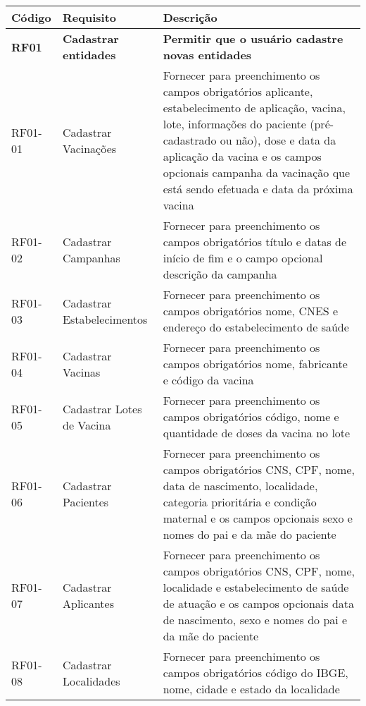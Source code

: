 
\label{apendice:requisitos_funcionais_detalhados}

\begin{longtable}{
  | >{\centering}m{} 
  | >{\centering}m{} 
  | m{} |}
  
    \hline
    \rowcolor{green!100}
    \textbf{Código} & \textbf{Requisito} & \textbf{Descrição} \\ \hline \hline
    \textbf{RF01}  &  \textbf{Cadastrar entidades} & \textbf{Permitir que o usuário cadastre novas entidades}  \\ \hline \hline
    RF01-01 & Cadastrar Vacinações              & Fornecer para preenchimento os campos obrigatórios aplicante, estabelecimento de aplicação, vacina, lote, informações do paciente (pré-cadastrado ou não), dose e data da aplicação da vacina e os campos opcionais campanha da vacinação que está sendo efetuada e data da próxima vacina \\ \hline
    RF01-02 & Cadastrar Campanhas               & Fornecer para preenchimento os campos obrigatórios título e datas de início de fim e o campo opcional descrição da campanha  \\ \hline
    RF01-03 & Cadastrar Estabelecimentos        & Fornecer para preenchimento os campos obrigatórios nome, CNES e endereço do estabelecimento de saúde \\ \hline
    RF01-04 & Cadastrar Vacinas                 & Fornecer para preenchimento os campos obrigatórios nome, fabricante e código da vacina \\ \hline
    RF01-05 & Cadastrar Lotes de Vacina         & Fornecer para preenchimento os campos obrigatórios código, nome e quantidade de doses da vacina no lote \\ \hline
    RF01-06 & Cadastrar Pacientes               & Fornecer para preenchimento os campos obrigatórios CNS, CPF, nome, data de nascimento, localidade, categoria prioritária e condição maternal e os campos opcionais sexo e nomes do pai e da mãe do paciente \\ \hline
    RF01-07 & Cadastrar Aplicantes              & Fornecer para preenchimento os campos obrigatórios CNS, CPF, nome, localidade e estabelecimento de saúde de atuação e os campos opcionais data de nascimento, sexo e nomes do pai e da mãe do paciente \\ \hline
    RF01-08 & Cadastrar Localidades             & Fornecer para preenchimento os campos obrigatórios código do IBGE, nome, cidade e estado da localidade \\ \hline

\end{longtable}
